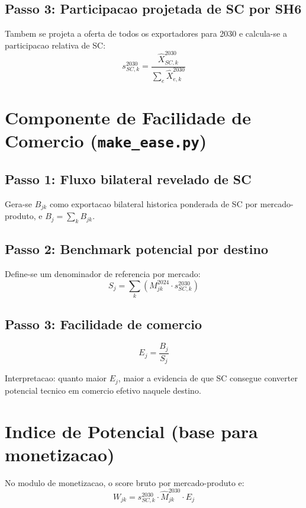 \documentclass[12pt,a4paper]{article}
\begin{document}
\subsection{Passo 3: Participacao projetada de SC por SH6}
Tambem se projeta a oferta de todos os exportadores para 2030 e calcula-se a participacao relativa de SC:
\begin{equation}
s_{SC,k}^{2030} = \frac{\widehat{X}_{SC,k}^{2030}}{\sum_e \widehat{X}_{e,k}^{2030}}
\end{equation}

\section{Componente de Facilidade de Comercio (\texttt{make\_ease.py})}
\subsection{Passo 1: Fluxo bilateral revelado de SC}
Gera-se $B_{jk}$ como exportacao bilateral historica ponderada de SC por mercado-produto, e $B_j=\sum_k B_{jk}$.

\subsection{Passo 2: Benchmark potencial por destino}
Define-se um denominador de referencia por mercado:
\begin{equation}
S_j = \sum_k \left(M_{jk}^{2024} \cdot s_{SC,k}^{2030}\right)
\end{equation}

\subsection{Passo 3: Facilidade de comercio}
\begin{equation}
E_j = \frac{B_j}{S_j}
\end{equation}

Interpretacao: quanto maior $E_j$, maior a evidencia de que SC consegue converter potencial tecnico em comercio efetivo naquele destino.

\section{Indice de Potencial (base para monetizacao)}
No modulo de monetizacao, o score bruto por mercado-produto e:
\begin{equation}
W_{jk} = s_{SC,k}^{2030} \cdot \widehat{M}_{jk}^{2030} \cdot E_j
\end{equation}
\end{document}
